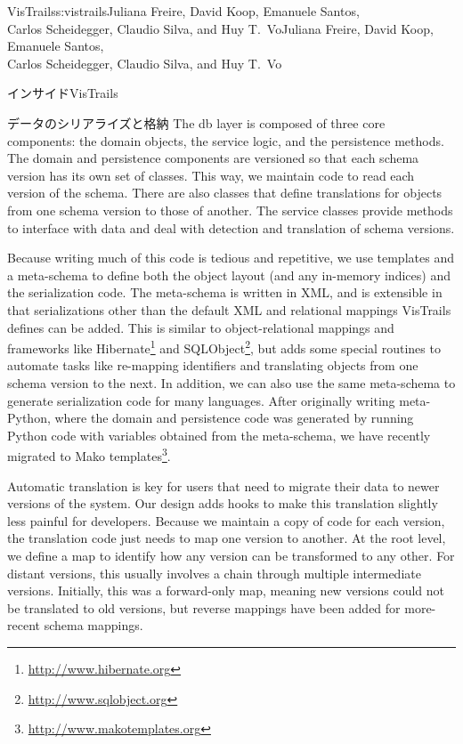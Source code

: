 \begin{aosachaptertoc}{VisTrails}{s:vistrails}{Juliana Freire, David Koop, Emanuele Santos, \\ Carlos Scheidegger, Claudio Silva, and Huy T.\ Vo}{Juliana Freire, David Koop, Emanuele Santos, \\ \hspace*{0.9cm} Carlos Scheidegger, Claudio Silva, and Huy T.\ Vo}
\begin{aosasect1}{インサイドVisTrails}
\begin{aosasect2}{データのシリアライズと格納}
The db layer is composed of three core components: the domain objects,
the service logic, and the persistence methods.  The domain and
persistence components are versioned so that each schema version has
its own set of classes.  This way, we maintain code to read each
version of the schema.  There are also classes that define
translations for objects from one schema version to those of another.
The service classes provide methods to interface with data and deal
with detection and translation of schema versions.

Because writing much of this code is tedious and repetitive, we use
templates and a meta-schema to define both the object layout (and any
in-memory indices) and the serialization code.  The meta-schema is
written in XML, and is extensible in that serializations other than
the default XML and relational mappings VisTrails defines can be
added.  This is similar to object-relational mappings and frameworks
like Hibernate\footnote{\url{http://www.hibernate.org}} and
SQLObject\footnote{\url{http://www.sqlobject.org}}, but adds some
special routines to automate tasks like re-mapping identifiers and
translating objects from one schema version to the next.  In addition,
we can also use the same meta-schema to generate serialization code
for many languages.  After originally writing meta-Python, where the
domain and persistence code was generated by running Python code with
variables obtained from the meta-schema, we have recently migrated to
Mako templates\footnote{\url{http://www.makotemplates.org}}.

Automatic translation is key for users that need to migrate their data
to newer versions of the system.  Our design adds hooks to make this
translation slightly less painful for developers.  Because we maintain
a copy of code for each version, the translation code just needs to
map one version to another.  At the root level, we define a map to
identify how any version can be transformed to any other.  For distant
versions, this usually involves a chain through multiple intermediate
versions.  Initially, this was a forward-only map, meaning new
versions could not be translated to old versions, but reverse mappings
have been added for more-recent schema mappings.


\end{aosasect2}
\end{aosasect1}
\end{aosachaptertoc}
